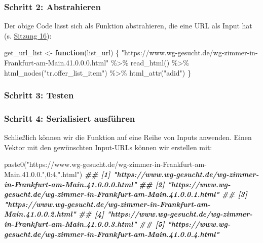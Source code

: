\documentclass[
  ngerman,
]{article}
\newenvironment{Shaded}{\begin{snugshade}}{\end{snugshade}}
\newcommand{\ControlFlowTok}[1]{\textcolor[rgb]{0.13,0.29,0.53}{\textbf{#1}}}
\newcommand{\DecValTok}[1]{\textcolor[rgb]{0.00,0.00,0.81}{#1}}
\newcommand{\DocumentationTok}[1]{\textcolor[rgb]{0.56,0.35,0.01}{\textbf{\textit{#1}}}}
\newcommand{\FunctionTok}[1]{\textcolor[rgb]{0.00,0.00,0.00}{#1}}
\newcommand{\NormalTok}[1]{#1}
\newcommand{\OtherTok}[1]{\textcolor[rgb]{0.56,0.35,0.01}{#1}}
\newcommand{\SpecialCharTok}[1]{\textcolor[rgb]{0.00,0.00,0.00}{#1}}
\newcommand{\StringTok}[1]{\textcolor[rgb]{0.31,0.60,0.02}{#1}}
\begin{document}
\hypertarget{schritt-2-abstrahieren}{%
\subsubsection{Schritt 2: Abstrahieren}\label{schritt-2-abstrahieren}}

Der obige Code lässt sich als Funktion abstrahieren, die eine URL als Input hat (s. \href{../16_breuer_2005_apis}{Sitzung 16}):

\begin{Shaded}
\begin{Highlighting}[]
\NormalTok{get\_url\_list }\OtherTok{\textless{}{-}} \ControlFlowTok{function}\NormalTok{(list\_url) \{}
  \StringTok{"https://www.wg{-}gesucht.de/wg{-}zimmer{-}in{-}Frankfurt{-}am{-}Main.41.0.0.0.html"} \SpecialCharTok{\%\textgreater{}\%}
    \FunctionTok{read\_html}\NormalTok{() }\SpecialCharTok{\%\textgreater{}\%}
    \FunctionTok{html\_nodes}\NormalTok{(}\StringTok{"tr.offer\_list\_item"}\NormalTok{) }\SpecialCharTok{\%\textgreater{}\%}
    \FunctionTok{html\_attr}\NormalTok{(}\StringTok{"adid"}\NormalTok{)}
\NormalTok{\}}
\end{Highlighting}
\end{Shaded}

\hypertarget{schritt-3-testen}{%
\subsubsection{Schritt 3: Testen}\label{schritt-3-testen}}

\hypertarget{schritt-4-serialisiert-ausfuxfchren}{%
\subsubsection{Schritt 4: Serialisiert ausführen}\label{schritt-4-serialisiert-ausfuxfchren}}

Schließlich können wir die Funktion auf eine Reihe von Inputs anwenden. Einen Vektor mit den gewünschten Input-URLs können wir erstellen mit:

\begin{Shaded}
\begin{Highlighting}[]
\FunctionTok{paste0}\NormalTok{(}\StringTok{"https://www.wg{-}gesucht.de/wg{-}zimmer{-}in{-}Frankfurt{-}am{-}Main.41.0.0."}\NormalTok{,}\DecValTok{0}\SpecialCharTok{:}\DecValTok{4}\NormalTok{,}\StringTok{".html"}\NormalTok{)}
\DocumentationTok{\#\# [1] "https://www.wg{-}gesucht.de/wg{-}zimmer{-}in{-}Frankfurt{-}am{-}Main.41.0.0.0.html"}
\DocumentationTok{\#\# [2] "https://www.wg{-}gesucht.de/wg{-}zimmer{-}in{-}Frankfurt{-}am{-}Main.41.0.0.1.html"}
\DocumentationTok{\#\# [3] "https://www.wg{-}gesucht.de/wg{-}zimmer{-}in{-}Frankfurt{-}am{-}Main.41.0.0.2.html"}
\DocumentationTok{\#\# [4] "https://www.wg{-}gesucht.de/wg{-}zimmer{-}in{-}Frankfurt{-}am{-}Main.41.0.0.3.html"}
\DocumentationTok{\#\# [5] "https://www.wg{-}gesucht.de/wg{-}zimmer{-}in{-}Frankfurt{-}am{-}Main.41.0.0.4.html"}
\end{Highlighting}
\end{Shaded}
\end{document}
